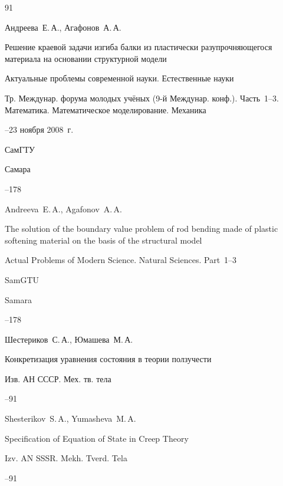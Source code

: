 \begin{thebibliography}{91}

\by Андреева~Е.\,А., Агафонов~А.\,А.

\paper Решение краевой задачи изгиба балки из пластически разупрочняющегося материала на основании структурной модели

\inbook Актуальные проблемы современной науки. Естественные науки

\bookinfo Тр. Междунар. форума молодых учёных (9-й Междунар. конф.). Часть~1--3. Математика. Математическое моделирование. Механика

--23 ноября 2008~г.

\publ СамГТУ

\publaddr Самара


--178

\misctransl

\by Andreeva~E.\,A., Agafonov~A.\,A.

\paper The solution of the boundary value problem of rod bending made of plastic softening   material on the basis of the structural model

\inbook Actual Problems of Modern Science. Natural Sciences. \rm Part~1--3

\publ SamGTU

\publaddr Samara


--178




\by Шестериков~С.\,А., Юмашева~М.\,А.

\paper Конкретизация уравнения состояния в теории ползучести

\jour Изв. АН СССР. Мех. тв. тела



--91

\misctransl

\by Shesterikov~S.\,A., Yumasheva~M.\,A.

\paper Specification of Equation of State in Creep Theory

\jour Izv. AN SSSR. Mekh. Tverd. Tela


--91






\end{thebibliography}

